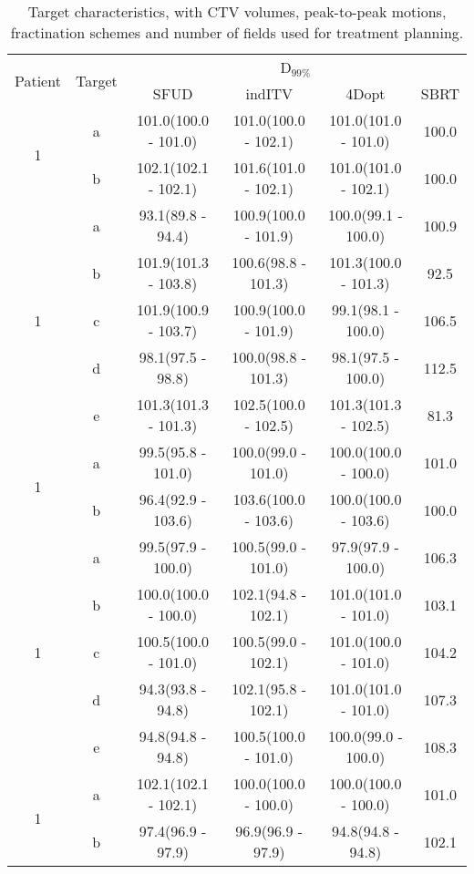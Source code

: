\begin{table}[H]
	\centering
	\caption{Target characteristics, with CTV volumes, peak-to-peak motions, fractination schemes and number of fields used for treatment planning.}
	\begin{tabular}{c|c|c|c|c|c}
		\hline\hline
		\multirow{2}{*}{Patient} & \multirow{2}{*}{Target} & \multicolumn{4}{|c}{D$_{99\%}$} \\
		 & & SFUD & indITV & 4Dopt & SBRT \\
		\hline
		
		\multirow{2}{*}{1} & a & 101.0(100.0 - 101.0) & 101.0(100.0 - 102.1) & 101.0(101.0 - 101.0) & 100.0\\ 
 & b & 102.1(102.1 - 102.1) & 101.6(101.0 - 102.1) & 101.0(101.0 - 102.1) & 100.0\\ 
\hline

\multirow{5}{*}{1} & a & 93.1(89.8 - 94.4) & 100.9(100.0 - 101.9) & 100.0(99.1 - 100.0) & 100.9\\ 
 & b & 101.9(101.3 - 103.8) & 100.6(98.8 - 101.3) & 101.3(100.0 - 101.3) & 92.5\\ 
 & c & 101.9(100.9 - 103.7) & 100.9(100.0 - 101.9) & 99.1(98.1 - 100.0) & 106.5\\ 
 & d & 98.1(97.5 - 98.8) & 100.0(98.8 - 101.3) & 98.1(97.5 - 100.0) & 112.5\\ 
 & e & 101.3(101.3 - 101.3) & 102.5(100.0 - 102.5) & 101.3(101.3 - 102.5) & 81.3\\ 
\hline

\multirow{2}{*}{1} & a & 99.5(95.8 - 101.0) & 100.0(99.0 - 101.0) & 100.0(100.0 - 100.0) & 101.0\\ 
 & b & 96.4(92.9 - 103.6) & 103.6(100.0 - 103.6) & 100.0(100.0 - 103.6) & 100.0\\ 
\hline

\multirow{5}{*}{1} & a & 99.5(97.9 - 100.0) & 100.5(99.0 - 101.0) & 97.9(97.9 - 100.0) & 106.3\\ 
 & b & 100.0(100.0 - 100.0) & 102.1(94.8 - 102.1) & 101.0(101.0 - 101.0) & 103.1\\ 
 & c & 100.5(100.0 - 101.0) & 100.5(99.0 - 102.1) & 101.0(100.0 - 101.0) & 104.2\\ 
 & d & 94.3(93.8 - 94.8) & 102.1(95.8 - 102.1) & 101.0(101.0 - 101.0) & 107.3\\ 
 & e & 94.8(94.8 - 94.8) & 100.5(100.0 - 101.0) & 100.0(99.0 - 100.0) & 108.3\\ 
\hline

\multirow{2}{*}{1} & a & 102.1(102.1 - 102.1) & 100.0(100.0 - 100.0) & 100.0(100.0 - 100.0) & 101.0\\ 
 & b & 97.4(96.9 - 97.9) & 96.9(96.9 - 97.9) & 94.8(94.8 - 94.8) & 102.1\\ 
\hline


\end{tabular}
\end{table}
